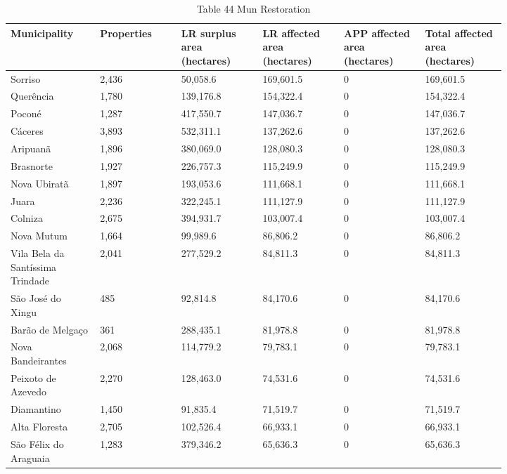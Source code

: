 \documentclass[12pt]{article}
\begin{document}
\begin{table}[H]
\centering
\caption{Table 44 Mun Restoration}
{\fontsize{12}{14}\selectfont
\setlength{\tabcolsep}{3pt}
\renewcommand{\arraystretch}{1.08}
\begin{tabular}{p{0.137\linewidth}p{0.137\linewidth}p{0.137\linewidth}p{0.137\linewidth}p{0.137\linewidth}p{0.137\linewidth}}
\toprule
Municipality & Properties & LR surplus area (hectares) & LR affected area (hectares) & APP affected area (hectares) & Total affected area (hectares) \\
\midrule
Sorriso & 2,436 & 50,058.6 & 169,601.5 & 0 & 169,601.5 \\
Querência & 1,780 & 139,176.8 & 154,322.4 & 0 & 154,322.4 \\
Poconé & 1,287 & 417,550.7 & 147,036.7 & 0 & 147,036.7 \\
Cáceres & 3,893 & 532,311.1 & 137,262.6 & 0 & 137,262.6 \\
Aripuanã & 1,896 & 380,069.0 & 128,080.3 & 0 & 128,080.3 \\
Brasnorte & 1,927 & 226,757.3 & 115,249.9 & 0 & 115,249.9 \\
Nova Ubiratã & 1,897 & 193,053.6 & 111,668.1 & 0 & 111,668.1 \\
Juara & 2,236 & 322,245.1 & 111,127.9 & 0 & 111,127.9 \\
Colniza & 2,675 & 394,931.7 & 103,007.4 & 0 & 103,007.4 \\
Nova Mutum & 1,664 & 99,989.6 & 86,806.2 & 0 & 86,806.2 \\
Vila Bela da Santíssima Trindade & 2,041 & 277,529.2 & 84,811.3 & 0 & 84,811.3 \\
São José do Xingu & 485 & 92,814.8 & 84,170.6 & 0 & 84,170.6 \\
Barão de Melgaço & 361 & 288,435.1 & 81,978.8 & 0 & 81,978.8 \\
Nova Bandeirantes & 2,068 & 114,779.2 & 79,783.1 & 0 & 79,783.1 \\
Peixoto de Azevedo & 2,270 & 128,463.0 & 74,531.6 & 0 & 74,531.6 \\
Diamantino & 1,450 & 91,835.4 & 71,519.7 & 0 & 71,519.7 \\
Alta Floresta & 2,705 & 102,526.4 & 66,933.1 & 0 & 66,933.1 \\
São Félix do Araguaia & 1,283 & 379,346.2 & 65,636.3 & 0 & 65,636.3 \\
\bottomrule
\end{tabular}
}
\end{table}
\end{document}
